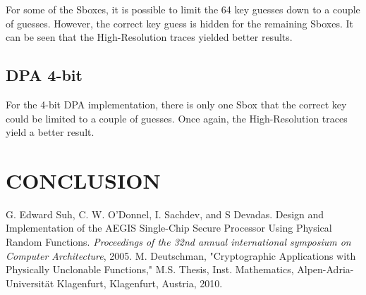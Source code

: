 \documentclass[letterpaper, 10 pt, conference]{ieeeconf}  %
\begin{document}
For some of the Sboxes, it is possible to limit the 64 key guesses down to a couple of guesses.  However, the correct key guess is hidden for the remaining Sboxes.  It can be seen that the High-Resolution traces yielded better results. 

\subsection{DPA 4-bit}

For the 4-bit DPA implementation, there is only one Sbox that the correct key could be limited to a couple of guesses.  Once again, the High-Resolution traces yield a better result.


\section{CONCLUSION}


\addtolength{\textheight}{-12cm}   %

















\begin{thebibliography}{99}

 G. Edward Suh, C. W. O'Donnel, I. Sachdev, and S Devadas. Design and Implementation of the AEGIS Single-Chip Secure Processor Using Physical Random Functions. \emph{Proceedings of the 32nd annual international symposium on Computer Architecture}, 2005.
 M. Deutschman, "Cryptographic Applications with Physically Unclonable Functions," M.S. Thesis, Inst. Mathematics, Alpen-Adria-Universit\"{a}t Klagenfurt, Klagenfurt, Austria, 2010.
 

\end{thebibliography}
\end{document}
